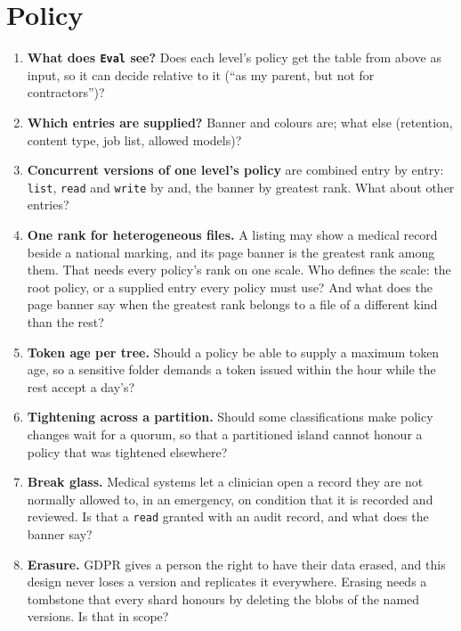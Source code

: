 \section{Policy}
\begin{enumerate}
\item \textbf{What does \texttt{Eval} see?} Does each level's policy get the table
  from above as input, so it can decide relative to it (``as my parent, but not
  for contractors'')?
\item \textbf{Which entries are supplied?} Banner and colours are; what else
  (retention, content type, job list, allowed models)?
\item \textbf{Concurrent versions of one level's policy} are combined entry by
  entry: \texttt{list}, \texttt{read} and \texttt{write} by and, the banner by
  greatest rank. What about other entries?
\item \textbf{One rank for heterogeneous files.} A listing may show a medical
  record beside a national marking, and its page banner is the greatest rank among
  them. That needs every policy's rank on one scale. Who defines the scale: the
  root policy, or a supplied entry every policy must use? And what does the page
  banner say when the greatest rank belongs to a file of a different kind than
  the rest?
\item \textbf{Token age per tree.} Should a policy be able to supply a maximum
  token age, so a sensitive folder demands a token issued within the hour while
  the rest accept a day's?
\item \textbf{Tightening across a partition.} Should some classifications make
  policy changes wait for a quorum, so that a partitioned island cannot honour a
  policy that was tightened elsewhere?
\item \textbf{Break glass.} Medical systems let a clinician open a record they
  are not normally allowed to, in an emergency, on condition that it is recorded
  and reviewed. Is that a \texttt{read} granted with an audit record, and what
  does the banner say?
\item \textbf{Erasure.} GDPR gives a person the right to have their data erased,
  and this design never loses a version and replicates it everywhere. Erasing
  needs a tombstone that every shard honours by deleting the blobs of the named
  versions. Is that in scope?
\end{enumerate}

